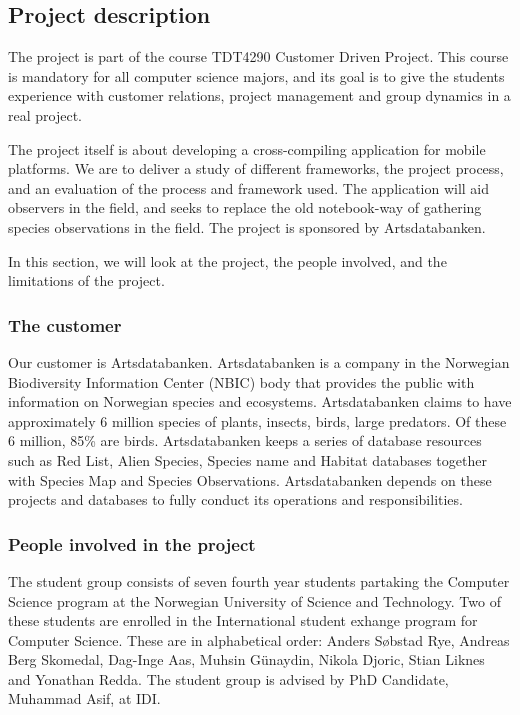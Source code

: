 \subsection{Project description}
The project is part of the course TDT4290 Customer Driven Project. This course
is mandatory for all computer science majors, and its goal is to give the
students experience with customer relations, project management and group
dynamics in a real project.

The project itself is about developing a cross-compiling application for mobile
platforms. We are to deliver a study of different frameworks, the project
process, and an evaluation of the process and framework used. The application
will aid observers in the field, and seeks to replace the old notebook-way of
gathering species observations in the field. The project is sponsored by
Artsdatabanken.

In this section, we will look at the project, the people involved, and the
limitations of the project.

\subsubsection{The customer}
Our customer is Artsdatabanken. Artsdatabanken is a company in the
Norwegian Biodiversity Information Center (NBIC) body that provides the
public with information on Norwegian species and ecosystems.
Artsdatabanken claims to have approximately 6 million species of plants,
insects, birds, large predators. Of these 6 million, 85\% are birds.
Artsdatabanken keeps a series of database resources such as Red List,
Alien Species, Species name and Habitat databases together with Species
Map and Species Observations. Artsdatabanken depends on these projects
and databases to fully conduct its operations and
responsibilities.\cite{artsdatabanken:about}

\subsubsection{People involved in the project}
The student group consists of seven fourth year students partaking the Computer
Science program at the Norwegian University of Science and Technology. Two of
these students are enrolled in the International student exhange program for
Computer Science. These are in alphabetical order: Anders Søbstad Rye, Andreas
Berg Skomedal, Dag-Inge Aas, Muhsin Günaydin, Nikola Djoric, Stian Liknes and
Yonathan Redda. The student group is advised by PhD Candidate, Muhammad Asif, at
IDI.

